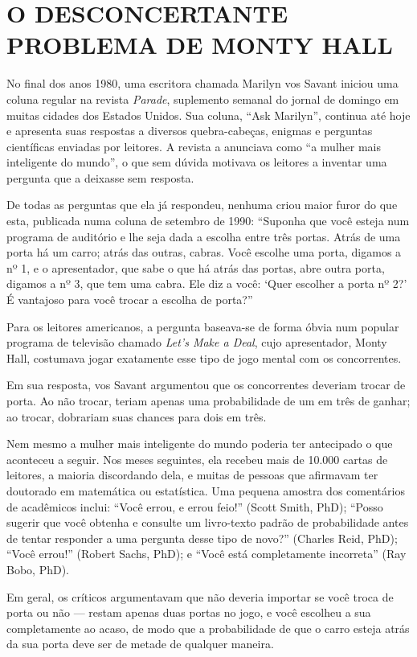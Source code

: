 \documentclass[11pt,a5paper,twoside]{book}
\begin{document}
\section{O DESCONCERTANTE PROBLEMA DE MONTY HALL}
No final dos anos 1980, uma escritora chamada Marilyn vos Savant iniciou uma coluna regular na revista \textit{Parade}, suplemento semanal do jornal de domingo em muitas cidades dos Estados Unidos. Sua coluna, “Ask Marilyn”, continua até hoje e apresenta suas respostas a diversos quebra-cabeças, enigmas e perguntas científicas enviadas por leitores. A revista a anunciava como “a mulher mais inteligente do mundo”, o que sem dúvida motivava os leitores a inventar uma pergunta que a deixasse sem resposta.

De todas as perguntas que ela já respondeu, nenhuma criou maior furor do que esta, publicada numa coluna de setembro de 1990: “Suponha que você esteja num programa de auditório e lhe seja dada a escolha entre três portas. Atrás de uma porta há um carro; atrás das outras, cabras. Você escolhe uma porta, digamos a nº 1, e o apresentador, que sabe o que há atrás das portas, abre outra porta, digamos a nº 3, que tem uma cabra. Ele diz a você: ‘Quer escolher a porta nº 2?’ É vantajoso para você trocar a escolha de porta?”

Para os leitores americanos, a pergunta baseava-se de forma óbvia num popular programa de televisão chamado \textit{Let’s Make a Deal}, cujo apresentador, Monty Hall, costumava jogar exatamente esse tipo de jogo mental com os concorrentes.

Em sua resposta, vos Savant argumentou que os concorrentes deveriam trocar de porta. Ao não trocar, teriam apenas uma probabilidade de um em três de ganhar; ao trocar, dobrariam suas chances para dois em três.

Nem mesmo a mulher mais inteligente do mundo poderia ter antecipado o que aconteceu a seguir. Nos meses seguintes, ela recebeu mais de 10.000 cartas de leitores, a maioria discordando dela, e muitas de pessoas que afirmavam ter doutorado em matemática ou estatística. Uma pequena amostra dos comentários de acadêmicos inclui: “Você errou, e errou feio!” (Scott Smith, PhD); “Posso sugerir que você obtenha e consulte um livro-texto padrão de probabilidade antes de tentar responder a uma pergunta desse tipo de novo?” (Charles Reid, PhD); “Você errou!” (Robert Sachs, PhD); e “Você está completamente incorreta” (Ray Bobo, PhD).

Em geral, os críticos argumentavam que não deveria importar se você troca de porta ou não — restam apenas duas portas no jogo, e você escolheu a sua completamente ao acaso, de modo que a probabilidade de que o carro esteja atrás da sua porta deve ser de metade de qualquer maneira.
\end{document}
